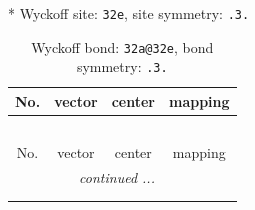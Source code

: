 \documentclass[fleqn,8pt]{jsarticle}
\begin{document}
* Wyckoff site: {\tt 32e}, site symmetry: {\tt .3.}
\renewcommand{\arraystretch}{1.2}
\begin{longtable}{cccc}
\caption{Wyckoff bond: {\tt 32a@32e}, bond symmetry: {\tt .3.}}
 \\
 \hline \hline
No. & vector & center & mapping \\ \hline \endfirsthead

\multicolumn{3}{l}{\tablename\ \thetable{}} \\
 \hline \hline
No. & vector & center & mapping \\ \hline \endhead

 \hline \hline
\multicolumn{3}{r}{\footnotesize\it continued ...} \\ \endfoot

 \hline \hline
\multicolumn{3}{r}{} \\ \endlastfoot


\end{longtable}
\end{document}
